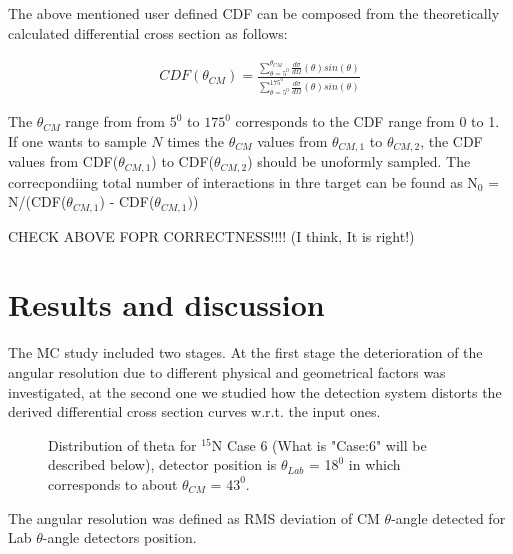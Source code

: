 \documentclass[%
 aip,
cp,  %
 amsmath,amssymb,%
 reprint,%
]{revtex4-2}
\begin{document}
The above mentioned user defined CDF can be composed from the theoretically calculated differential cross section as follows:

\begin{eqnarray}
 CDF(\theta_{CM}) = \frac{ \sum\limits_{\theta=5^0}^{\theta_{CM}} \frac{d\sigma}{d\Omega}(\theta) sin(\theta)} { \sum\limits_{\theta=5^0}^{175^0} \frac{d\sigma}{d\Omega}(\theta) sin(\theta)}
\end{eqnarray}

The $\theta_{CM}$ range from from $5 ^0$ to $175 ^0$ corresponds to the CDF range from 0 to 1.  If one wants to sample $N$ times the $\theta_{CM}$ values from $\theta_{CM, 1}$ to $\theta_{CM, 2}$, the CDF values from CDF($\theta_{CM, 1}$) to CDF($\theta_{CM, 2}$) should be unoformly sampled.  The correcpondiing total  number of interactions in thre target can be found as N$_0$ = N/(CDF($\theta_{CM, 1}$) - CDF($\theta_{CM, 1})$)

 CHECK ABOVE FOPR CORRECTNESS!!!! (I think, It is right!)


\section{Results and discussion}

The MC study included two stages. At the first stage the deterioration of the angular resolution due to different physical and geometrical factors  was investigated, at the second one we studied how the detection system distorts the derived differential cross section curves w.r.t. the input ones.

\begin{figure}[h]
\caption{Distribution of theta for ${}^{15}$N Case 6 (What is "Case:6" will be described below), detector position is $\theta_{Lab}$ = 1$8^0$ in which corresponds to about $\theta_{CM}$ = 4$3^0$.}
\label{ris:fig2}
\end{figure}

The angular resolution was defined as RMS deviation of CM $\theta$-angle detected for Lab $\theta$-angle detectors position.
\end{document}
